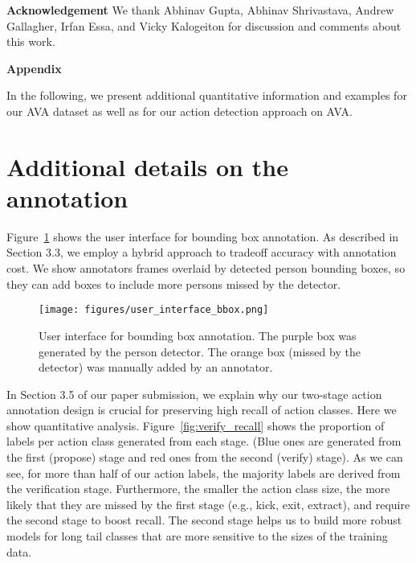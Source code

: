\documentclass[10pt,twocolumn,letterpaper]{article}
\begin{document}
\vspace{1mm}

\noindent\textbf{Acknowledgement} We thank Abhinav Gupta, Abhinav Shrivastava, Andrew Gallagher, Irfan Essa, and Vicky Kalogeiton for discussion and comments about this work.

{\small


}

\newpage
\begin{center}
\large\bf Appendix
\end{center}


\noindent
In the following, we present additional quantitative information and examples for our AVA dataset as well as for our action detection approach on AVA. 

\section{Additional details on the annotation}

Figure~\ref{fig:ui_bbox} shows the user interface for bounding box annotation. As described in Section 3.3, we employ a hybrid approach to tradeoff accuracy with annotation cost. We show annotators frames overlaid by detected person bounding boxes, so they can add boxes to include more persons missed by the detector.

\begin{figure}[h]
    \centering
    \texttt{[image: figures/user\_interface\_bbox.png]}
    \caption{User interface for bounding box annotation. The purple box was generated by the person detector. The orange box (missed by the detector) was manually added by an annotator. }
    \label{fig:ui_bbox}
\end{figure}

In Section 3.5 of our paper submission, we explain why our two-stage action annotation design is crucial for preserving high recall of action classes. Here we show quantitative analysis. Figure~\ref{fig:verify_recall} shows the proportion of labels per action class generated from each stage. (Blue ones are generated from the first (propose) stage and red ones from the second (verify) stage). As we can see, for more than half of our action labels, the majority labels are derived from the verification stage. Furthermore, the smaller the action class size, the more likely that they are missed by the first stage (e.g., kick, exit, extract), and require the second stage to boost recall. The second stage helps us to build more robust models for long tail classes that are more sensitive to the sizes of the training data.
\end{document}
